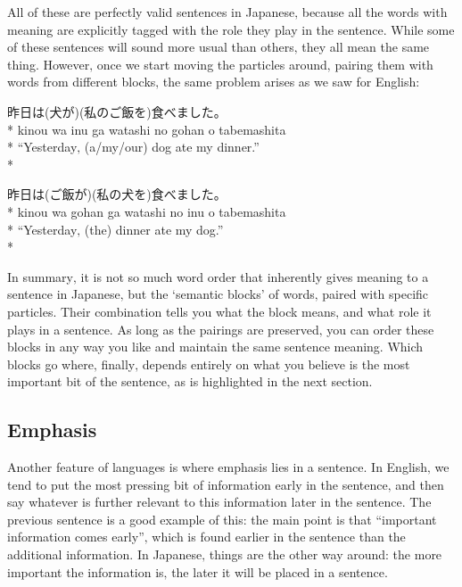 \documentclass[11pt, b5paper, twoside, openright, onecolumn]{book}
\newenvironment{exampleblock}{
\setlength{\parindent}{0.6in}
\begin{minipage}[t]{\dimexpr\textwidth-\parindent}}
{\end{minipage}}
\begin{document}
All of these are perfectly valid sentences in Japanese‚ because all the words with meaning are explicitly tagged with the role they play in the sentence.  While some of these sentences will sound more usual than others‚ they all mean the same thing. However‚ once we start moving the particles around‚ pairing them with words from different blocks‚ the same problem arises as we saw for English:

\vspace{0.4cm}
\begin{exampleblock}
昨日は(犬が)(私のご飯を)食べました。 \\* 
kinou wa inu ga watashi no gohan o tabemashita \\* 
“Yesterday‚ (a/my/our) dog ate my dinner.” \\* 
\end{exampleblock}
\vspace{0.2cm}

\begin{exampleblock}
昨日は(ご飯が)(私の犬を)食べました。 \\* 
kinou wa gohan ga watashi no inu o tabemashita \\* 
“Yesterday‚ (the) dinner ate my dog.” \\* 
\end{exampleblock}
\vspace{0.2cm}

In summary‚ it is not so much word order that inherently gives meaning to a sentence in Japanese‚ but the ‘semantic blocks’ of words‚ paired with specific particles. Their combination tells you what the block means‚ and what role it plays in a sentence. As long as the pairings are preserved‚ you can order these blocks in any way you like and maintain the same sentence meaning. Which blocks go where‚ finally‚ depends entirely on what you believe is the most important bit of the sentence‚ as is highlighted in the next section.

\subsection{Emphasis}

Another feature of languages is where emphasis lies in a sentence. In English‚ we tend to put the most pressing bit of information early in the sentence‚ and then say whatever is further relevant to this information later in the sentence. The previous sentence is a good example of this: the main point is that “important information comes early”‚ which is found earlier in the sentence than the additional information. In Japanese‚ things are the other way around: the more important the information is‚ the later it will be placed in a sentence.
\end{document}
